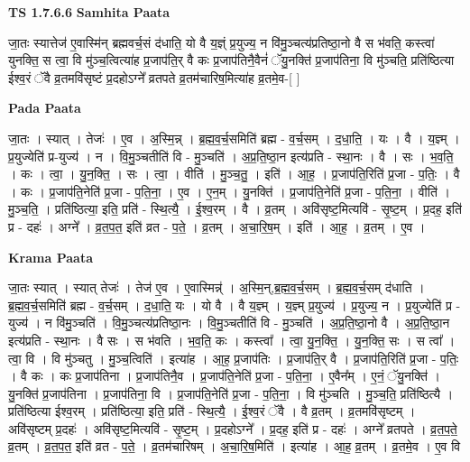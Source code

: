 \documentclass[17pt]{extarticle}
\begin{document}
\textbf{TS 1.7.6.6 } \newline
\textbf{Samhita Paata} \newline

जा॒तः स्यात्तेज॑ ए॒वास्मि॑न् ब्रह्मवर्च॒सं द॑धाति॒ यो वै य॒ज्ञ्ं प्र॒युज्य॒ न वि॑मु॒ञ्चत्य॑प्रतिष्ठा॒नो वै स भ॑वति॒ कस्त्वा॑ युनक्ति॒ स त्वा॒ वि मु॑ञ्च॒त्वित्या॑ह प्र॒जाप॑ति॒र् वै कः प्र॒जाप॑तिनै॒वैनं॑ ॅयु॒नक्ति॑ प्र॒जाप॑तिना॒ वि मु॑ञ्चति॒ प्रति॑ष्ठित्या ईश्व॒रं ॅवै व्र॒तमवि॑सृष्टं प्र॒दहोऽग्ने᳚ व्रतपते व्र॒तम॑चारिष॒मित्या॑ह व्र॒तमे॒व-[ ] \newline

\textbf{Pada Paata} \newline

जा॒तः । स्यात् । तेजः॑ । ए॒व । अ॒स्मि॒न्न् । ब्र॒ह्म॒व॒र्च॒समिति॑ ब्रह्म - व॒र्च॒सम् । द॒धा॒ति॒ । यः । वै । य॒ज्ञ्म् । प्र॒युज्येति॑ प्र-युज्य॑ । न । वि॒मु॒ञ्चतीति॑ वि - मु॒ञ्चति॑ । अ॒प्र॒ति॒ष्ठा॒न इत्य॑प्रति - स्था॒नः । वै । सः । भ॒व॒ति॒ । कः । त्वा॒ । यु॒न॒क्ति॒ । सः । त्वा॒ । वीति॑ । मु॒ञ्च॒तु॒ । इति॑ । आ॒ह॒ । प्र॒जाप॑ति॒रिति॑ प्र॒जा - प॒तिः॒ । वै । कः । प्र॒जाप॑ति॒नेति॑ प्र॒जा - प॒ति॒ना॒ । ए॒व । ए॒न॒म् । यु॒नक्ति॑ । प्र॒जाप॑ति॒नेति॑ प्र॒जा - प॒ति॒ना॒ । वीति॑ । मु॒ञ्च॒ति॒ । प्रति॑ष्ठित्या॒ इति॒ प्रति॑ - स्थि॒त्यै॒ । ई॒श्व॒रम् । वै । व्र॒तम् । अवि॑सृष्ट॒मित्यवि॑ - सृ॒ष्ट॒म् । प्र॒दह॒ इति॑ प्र - दहः॑ । अग्ने᳚ । व्र॒त॒प॒त॒ इति॑ व्रत - प॒ते॒ । व्र॒तम् । अ॒चा॒रि॒ष॒म् । इति॑ । आ॒ह॒ । व्र॒तम् । ए॒व ।  \newline


\textbf{Krama Paata} \newline

जा॒तः स्यात् । स्यात् तेजः॑ । तेज॑ ए॒व । ए॒वास्मिन्न्॑ । अ॒स्मि॒न्,ब्र॒ह्म॒व॒र्च॒सम् । ब्र॒ह्म॒व॒र्च॒सम् द॑धाति । ब्र॒ह्म॒व॒र्च॒समिति॑ ब्रह्म - व॒र्च॒सम् । द॒धा॒ति॒ यः । यो वै । वै य॒ज्ञ्म् । य॒ज्ञ्म् प्र॒युज्य॑ । प्र॒युज्य॒ न । प्र॒युज्येति॑ प्र - युज्य॑ । न वि॑मु॒ञ्चति॑ । वि॒मु॒ञ्चत्य॑प्रतिष्ठा॒नः । वि॒मु॒ञ्चतीति॑ वि - मु॒ञ्चति॑ । अ॒प्र॒ति॒ष्ठा॒नो वै । अ॒प्र॒ति॒ष्ठा॒न इत्य॑प्रति - स्था॒नः । वै सः । स भ॑वति । भ॒व॒ति॒ कः । कस्त्वा᳚ । त्वा॒ यु॒न॒क्ति॒ । यु॒न॒क्ति॒ सः । स त्वा᳚ । त्वा॒ वि । वि मु॑ञ्चतु । मु॒ञ्च॒त्विति॑ । इत्या॑ह । आ॒ह॒ प्र॒जाप॑तिः । प्र॒जाप॑ति॒र् वै । प्र॒जाप॑ति॒रिति॑ प्र॒जा - प॒तिः॒ । वै कः । कः प्र॒जाप॑तिना । प्र॒जाप॑तिनै॒व । प्र॒जाप॑ति॒नेति॑ प्र॒जा - प॒ति॒ना॒ । ए॒वैन᳚म् । ए॒नं॒ ॅयु॒नक्ति॑ । यु॒नक्ति॑ प्र॒जाप॑तिना । प्र॒जाप॑तिना॒ वि । प्र॒जाप॑ति॒नेति॑ प्र॒जा - प॒ति॒ना॒ । वि मु॑ञ्चति । मु॒ञ्च॒ति॒ प्रति॑ष्ठित्यै । प्रति॑ष्ठित्या ईश्व॒रम् । प्रति॑ष्ठित्या॒ इति॒ प्रति॑ - स्थि॒त्यै॒ । ई॒श्व॒रं ॅवै । वै व्र॒तम् । व्र॒तमवि॑सृष्टम् । अवि॑सृष्टम् प्र॒दहः॑ । अवि॑सृष्ट॒मित्यवि॑ - सृ॒ष्ट॒म् । प्र॒दहोऽग्ने᳚ । प्र॒दह॒ इति॑ प्र - दहः॑ । अग्ने᳚ व्रतपते । व्र॒त॒प॒ते॒ व्र॒तम् । व्र॒त॒प॒त॒ इति॑ व्रत - प॒ते॒ । व्र॒तम॑चारिषम् । अ॒चा॒रि॒ष॒मिति॑ । इत्या॑ह । आ॒ह॒ व्र॒तम् । व्र॒तमे॒व । ए॒व वि \newline
\end{document}
